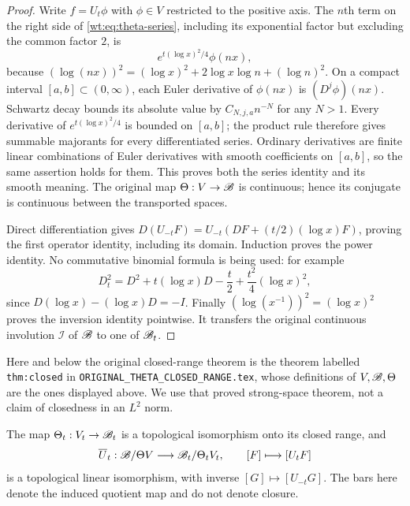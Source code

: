 \begin{proof}
Write $f=U_t\phi$ with $\phi\in V$ restricted to the positive
axis.  The $n$th term on the right side of
\eqref{wt:eq:theta-series}, including its exponential factor but
excluding the common factor $2$, is
\[
 e^{t(\log x)^2/4}\phi(nx),
\]
because
$(\log(nx))^2=(\log x)^2+2\log x\log n+(\log n)^2$.
On a compact interval $[a,b]\subset(0,\infty)$, each Euler
derivative of $\phi(nx)$ is $(D^j\phi)(nx)$.  Schwartz decay
bounds its absolute value by $C_{N,j,a}n^{-N}$ for any $N>1$.
Every derivative of $e^{t(\log x)^2/4}$ is bounded on $[a,b]$;
the product rule therefore gives summable majorants for every
differentiated series.  Ordinary derivatives are finite linear
combinations of Euler derivatives with smooth coefficients on
$[a,b]$, so the same assertion holds for them.  This proves both
the series identity and its smooth meaning.  The original map
$\Theta:V\to\mathscr B$ is continuous; hence its conjugate is continuous
between the transported spaces.

Direct differentiation gives
$D(U_{-t}F)=U_{-t}(DF+(t/2)(\log x)F)$, proving the first
operator identity, including its domain.  Induction proves the
power identity.  No commutative binomial formula is being used:
for example
\[
 D_t^2=D^2+t(\log x)D-\frac t2+\frac{t^2}{4}(\log x)^2,
\]
since $D(\log x)- (\log x)D=-I$.  Finally
$(\log(x^{-1}))^2=(\log x)^2$ proves the inversion identity
pointwise.  It transfers the original continuous involution
$\mathcal I$ of $\mathscr B$ to one of $\mathscr B_t$.
\end{proof}

Here and below the original closed-range theorem is the theorem
labelled \texttt{thm:closed} in
\texttt{ORIGINAL\_THETA\_CLOSED\_RANGE.tex}, whose definitions
of $V,\mathscr B,\Theta$ are the ones displayed above.  We use that proved
strong-space theorem, not a claim of closedness in an $L^2$ norm.

\begin{corollary}
\label{wt:cor:quotient}
The map $\Theta_t:V_t\to\mathscr B_t$ is a topological isomorphism
onto its closed range, and
\begin{equation}\label{wt:eq:strong-quotient}
 \overline U_t:\mathscr B/\Theta V\longrightarrow\mathscr B_t/\Theta_tV_t,
 \qquad [F]\longmapsto[U_tF]
\end{equation}
is a topological linear isomorphism, with inverse
$[G]\mapsto[U_{-t}G]$.  The bars here denote the induced quotient
map and do not denote closure.
\end{corollary}

